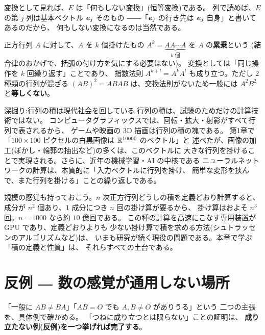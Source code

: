 変換として見れば、$E$ は「何もしない変換」(恒等変換)である。
列で読めば、$E$ の第 $j$ 列は基本ベクトル $\bm{e}_j$ そのもの
――「$\bm{e}_j$ の行き先は $\bm{e}_j$ 自身」と書いてあるのだから、
何もしない変換になるのは当然である。

正方行列 $A$ に対して、$A$ を $k$ 個掛けたもの
$A^k = \underbrace{AA \cdots A}_{k \text{ 個}}$ を $A$ の\textbf{累乗}という
(結合律のおかげで、括弧の付け方を気にする必要はない)。
変換としては「同じ操作を $k$ 回繰り返す」ことであり、
指数法則 $A^{k+l} = A^k A^l$ も成り立つ。ただし $2$ 種類の行列が混ざる
$(AB)^2 = ABAB$ は、交換法則がないため一般には $A^2 B^2$ と\textbf{等しくない}。

\begin{itembox}[l]{深掘り:行列の積は現代社会を回している}
行列の積は、試験のためだけの計算技術ではない。
コンピュータグラフィックスでは、回転・拡大・射影がすべて行列で表されるから、
ゲームや映画の $3$D 描画は行列の積の塊である。
第1章で「$100 \times 100$ ピクセルの白黒画像は $\mathbb{R}^{10000}$ のベクトル」と
述べたが、画像の加工(ぼかし・輪郭の抽出など)の多くは、このベクトルに
大きな行列を掛けることで実現される。さらに、近年の機械学習・AI の中核である
ニューラルネットワークの計算は、本質的に「入力ベクトルに行列を掛け、
簡単な変形を挟んで、また行列を掛ける」ことの繰り返しである。

規模の感覚も持っておこう。$n$ 次正方行列どうしの積を定義どおり計算すると、
成分が $n^2$ 個あり、$1$ 成分につき $n$ 回の掛け算が要るから、
掛け算はおよそ $n^3$ 回。$n = 1000$ なら約 $10$ 億回である。
この種の計算を高速にこなす専用装置が GPU であり、定義どおりよりも
少ない掛け算で積を求める方法(シュトラッセンのアルゴリズムなど)は、
いまも研究が続く現役の問題である。本章で学ぶ「積の定義と性質」は、
それらすべての土台である。
\end{itembox}

\section{反例 ― 数の感覚が通用しない場所}

「一般に $AB \neq BA$」「$AB = O$ でも $A, B \neq O$ がありうる」という
二つの主張を、具体例で確かめる。
「つねに成り立つとは限らない」ことの証明は、
\textbf{成り立たない例(反例)を一つ挙げれば完了する}。

